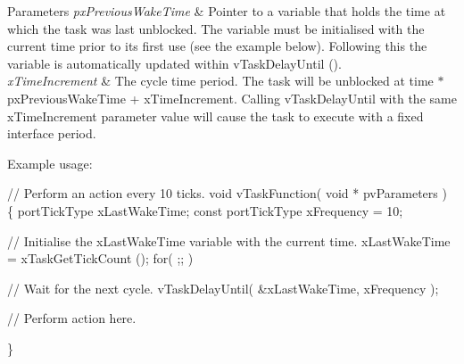 \begin{DoxyParams}{Parameters}
{\em px\+Previous\+Wake\+Time} & Pointer to a variable that holds the time at which the task was last unblocked. The variable must be initialised with the current time prior to its first use (see the example below). Following this the variable is automatically updated within v\+Task\+Delay\+Until ().\\
\hline
{\em x\+Time\+Increment} & The cycle time period. The task will be unblocked at time $\ast$px\+Previous\+Wake\+Time + x\+Time\+Increment. Calling v\+Task\+Delay\+Until with the same x\+Time\+Increment parameter value will cause the task to execute with a fixed interface period.\\
\hline
\end{DoxyParams}
Example usage\+: 
\begin{DoxyPre}
// Perform an action every 10 ticks.
void vTaskFunction( void * pvParameters )
\{
portTickType xLastWakeTime;
const portTickType xFrequency = 10;
\begin{DoxyVerb}// Initialise the xLastWakeTime variable with the current time.
xLastWakeTime = xTaskGetTickCount ();
for( ;; )
{
 // Wait for the next cycle.
 vTaskDelayUntil( &xLastWakeTime, xFrequency );

 // Perform action here.
}
\end{DoxyVerb}

\}
  \end{DoxyPre}
 